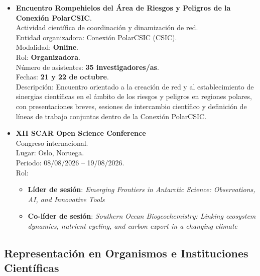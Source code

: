 \documentclass[11pt,a4paper]{article}
\begin{document}
\begin{itemize}[leftmargin=*]
    \item \textbf{Encuentro Rompehielos del Área de Riesgos y Peligros de la Conexión PolarCSIC}.\\
Actividad científica de coordinación y dinamización de red.\\
Entidad organizadora: Conexión PolarCSIC (CSIC).\\
Modalidad: \textbf{Online}.\\
Rol: \textbf{Organizadora}.\\
Número de asistentes: \textbf{35 investigadores/as}.\\
Fechas: \textbf{21 y 22 de octubre}.\\
Descripción: Encuentro orientado a la creación de red y al establecimiento de sinergias científicas en el ámbito de los riesgos y peligros en regiones polares, con presentaciones breves, sesiones de intercambio científico y definición de líneas de trabajo conjuntas dentro de la Conexión PolarCSIC.

    \item \textbf{XII SCAR Open Science Conference}\\
    Congreso internacional.\\
    Lugar: Oslo, Noruega.\\
    Periodo: 08/08/2026 -- 19/08/2026.\\
    Rol:
    \begin{itemize}
        \item \textbf{Líder de sesión}: \textit{Emerging Frontiers in Antarctic Science: Observations, AI, and Innovative Tools}
        \item \textbf{Co-líder de sesión}: \textit{Southern Ocean Biogeochemistry: Linking ecosystem dynamics, nutrient cycling, and carbon export in a changing climate}
    \end{itemize}

\end{itemize}

\subsection{Representación en Organismos e Instituciones Científicas}
\end{document}
